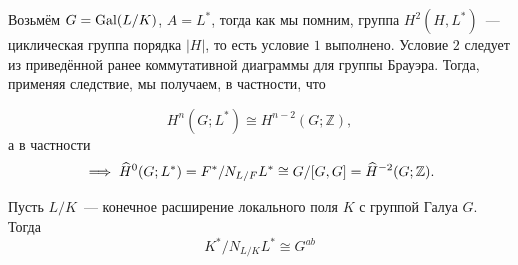  		Возьмём $G = \operatorname{Gal}(L/K)$, $A = L^*$, тогда как мы помним, группа $H^2(H, L^*)$~--- циклическая группа порядка $|H|$, то есть условие $1$ выполнено. Условие $2$ следует из приведённой ранее коммутативной диаграммы для группы Брауэра. Тогда, применяя следствие, мы получаем, в частности, что 

   \[ H^n(G; L^*) \cong H^{n - 2}(G; \mathbb{Z}) ,\] 
   а в частности 
 	\[
 		 \implies \widehat{H}^{0}(G; L^*) = F^* /N_{L/F}L^* \cong G/[G, G] = \widehat{H}^{-2}(G; \mathbb{Z}).
 	\]

    \begin{corollary}\label{normal_subgroup_abelinisation}
 		Пусть $L/K$~--- конечное расширение локального поля $K$ с группой Галуа $G$. Тогда 
 		\[	
 		 K^*/N_{L/K}L^* \cong G^{ab}
 		 \]
 	\end{corollary}
